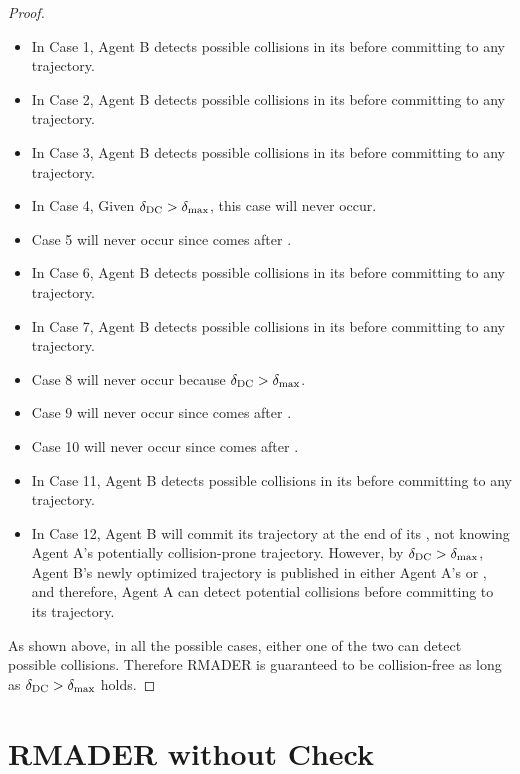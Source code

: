 \begin{proof}
\begin{itemize}
\item In Case 1, Agent B detects possible collisions in its \CStep{} before committing to any trajectory.
\item In Case 2, Agent B detects possible collisions in its \DCStep{} before committing to any trajectory.
\item In Case 3, Agent B detects possible collisions in its \DCStep{} before committing to any trajectory.
\item In Case 4, Given $\delta_\text{DC}{}>\delta_\text{max}{}$, this case will never occur.
\item Case 5 will never occur since \CStep{} comes after \OStep{}.
\item In Case 6, Agent B detects possible collisions in its \DCStep{} before committing to any trajectory.
\item In Case 7, Agent B detects possible collisions in its \DCStep{} before committing to any trajectory.
\item Case 8 will never occur because $\delta_\text{DC}{}>\delta_\text{max}{}$.
\item Case 9 will never occur since \DCStep{} comes after \OStep{}.
\item Case 10 will never occur since \DCStep{} comes after \CStep{}.
\item In Case 11, Agent B detects possible collisions in its \DCStep{} before committing to any trajectory.
\item In Case 12, Agent B will commit its trajectory at the end of its \DCStep{}, not knowing Agent A's potentially collision-prone trajectory. However, by $\delta_\text{DC}{}>\delta_\text{max}{}$, Agent B's newly optimized trajectory is published in either Agent A's \OStep{} or \CStep{}, and therefore, Agent A can detect potential collisions before committing to its trajectory.
\end{itemize}

As shown above, in all the possible cases, either one of the two can detect possible collisions. Therefore RMADER is guaranteed to be collision-free as long as $\delta_\text{DC}{}>\delta_\text{max}{}$ holds.
\end{proof}

\section{RMADER without Check}

